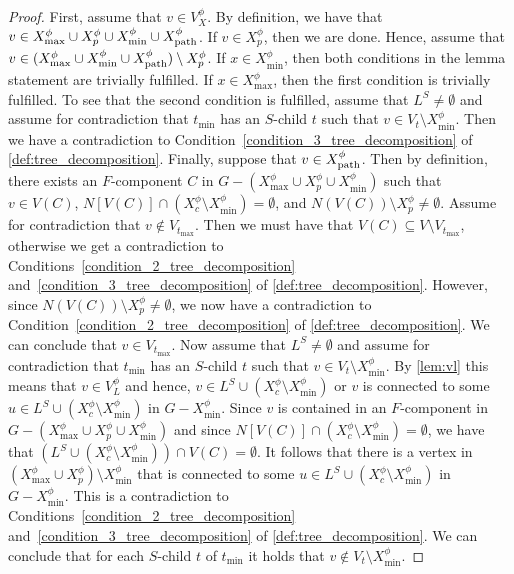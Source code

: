 \documentclass[a4paper,UKenglish,cleveref, autoref, thm-restate, numberwithinsect]{lipics-v2021}
\newcommand{\dpath}{\textup{path}}
\begin{document}
\begin{proof}
First, assume that $v\in V^\phi_X$. By definition, we have that $v\in X^\phi_{\max}\cup X^\phi_p\cup X^\phi_{\min}\cup X^\phi_{\dpath}$. If $v\in X^\phi_p$, then we are done. Hence, assume that $v\in (X^\phi_{\max}\cup X^\phi_{\min}\cup X^\phi_{\dpath})\setminus X^\phi_p$.
    If $x\in X^\phi_{\min}$, then both conditions in the lemma statement are trivially fulfilled. If $x\in X^\phi_{\max}$, then the first condition is trivially fulfilled. To see that the second condition is fulfilled, assume that $L^S\neq\emptyset$ and assume for contradiction that $t_{\min}$ has an $S$-child $t$ such that $v\in V_t\setminus X^\phi_{\min}$. Then we have a contradiction to Condition~\ref{condition_3_tree_decomposition} of \cref{def:tree_decomposition}.
    Finally, suppose that $v\in X^\phi_{\dpath}$. 
    Then by definition, there exists an $F$-component $C$ in $G-(X^\phi_{\max}\cup X^\phi_p\cup X^\phi_{\min})$ such that $v\in V(C)$, $N[V(C)]\cap (X^\phi_c\setminus X^\phi_{\min})=\emptyset$, and $N(V(C))\setminus X^\phi_p\neq\emptyset$. Assume for contradiction that $v\notin V_{t_{\max}}$. Then we must have that $V(C)\subseteq V\setminus V_{t_{\max}}$, otherwise we get a contradiction to Conditions~\ref{condition_2_tree_decomposition} and~\ref{condition_3_tree_decomposition} of \cref{def:tree_decomposition}. However, since $N(V(C))\setminus X^\phi_p\neq\emptyset$, we now have a contradiction to Condition~\ref{condition_2_tree_decomposition} of \cref{def:tree_decomposition}. We can conclude that $v\in V_{t_{\max}}$. 
Now assume that $L^S\neq\emptyset$ and assume for contradiction that $t_{\min}$ has an $S$-child $t$ such that $v\in V_t\setminus X^\phi_{\min}$. By \cref{lem:vl} this means that $v\in V^\phi_L$ and hence, $v\in L^S\cup (X^\phi_c\setminus X^\phi_{\min})$ or $v$ is connected to some $u\in L^S\cup (X^\phi_c\setminus X^\phi_{\min})$ in $G-X^\phi_{\min}$. 
Since $v$ is contained in an $F$-component in $G-(X^\phi_{\max}\cup X^\phi_p\cup X^\phi_{\min})$ and since $N[V(C)]\cap (X^\phi_c\setminus X^\phi_{\min})=\emptyset$, we have that $(L^S\cup (X^\phi_c\setminus X^\phi_{\min}))\cap V(C)=\emptyset$.
It follows that there is a vertex in $(X^\phi_{\max}\cup X^\phi_p)\setminus X^\phi_{\min}$ that is connected to some $u\in L^S\cup (X^\phi_c\setminus X^\phi_{\min})$ in $G-X^\phi_{\min}$. This is a contradiction to Conditions~\ref{condition_2_tree_decomposition} and~\ref{condition_3_tree_decomposition} of \cref{def:tree_decomposition}. We can conclude that for each $S$-child $t$ of $t_{\min}$ it holds that $v\notin V_t\setminus X^\phi_{\min}$.


\end{proof}
\end{document}
